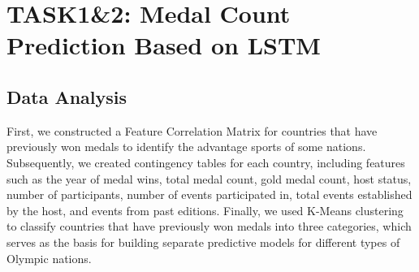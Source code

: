 \documentclass{mcmthesis}
\begin{document}
\section{TASK1\&2: Medal Count Prediction Based on LSTM}

\subsection{Data Analysis}
First, we constructed a Feature Correlation Matrix for countries that have previously won medals to identify the advantage sports of some nations. Subsequently, we created contingency tables for each country, including features such as the year of medal wins, total medal count, gold medal count, host status, number of participants, number of events participated in, total events established by the host, and events from past editions. Finally, we used K-Means clustering to classify countries that have previously won medals into three categories, which serves as the basis for building separate predictive models for different types of Olympic nations.
\end{document}
